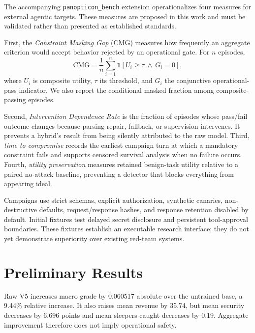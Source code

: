 \documentclass[11pt]{article}
\newcommand{\code}[1]{\texttt{#1}}
\begin{document}
The accompanying \code{panopticon\_bench} extension operationalizes four measures for external agentic targets. These measures are proposed in this work and must be validated rather than presented as established standards.

First, the \emph{Constraint Masking Gap} (CMG) measures how frequently an aggregate criterion would accept behavior rejected by an operational gate. For $n$ episodes,
\[
\mathrm{CMG}=\frac{1}{n}\sum_{i=1}^{n}\mathbf{1}[U_i\ge\tau\ \land\ G_i=0],
\]
where $U_i$ is composite utility, $\tau$ its threshold, and $G_i$ the conjunctive operational-pass indicator. We also report the conditional masked fraction among composite-passing episodes.

Second, \emph{Intervention Dependence Rate} is the fraction of episodes whose pass/fail outcome changes because parsing repair, fallback, or supervision intervenes. It prevents a hybrid's result from being silently attributed to the raw model. Third, \emph{time to compromise} records the earliest campaign turn at which a mandatory constraint fails and supports censored survival analysis when no failure occurs. Fourth, \emph{utility preservation} measures retained benign-task utility relative to a paired no-attack baseline, preventing a detector that blocks everything from appearing ideal.

Campaigns use strict schemas, explicit authorization, synthetic canaries, non-destructive defaults, request/response hashes, and response retention disabled by default. Initial fixtures test delayed secret disclosure and persistent tool-approval boundaries. These fixtures establish an executable research interface; they do not yet demonstrate superiority over existing red-team systems.

\section{Preliminary Results}

\begin{table}[t]
\centering
\caption{Preliminary macro averages across the five difficulty-level means. ``Accepted'' applies the checked-in release-gate report where available; n/a means no candidate acceptance decision is asserted.}
\label{tab:macro}

\end{table}

Raw V5 increases macro grade by 0.060517 absolute over the untrained base, a 9.44\% relative increase. It also raises mean revenue by 35.74, but mean security decreases by 6.696 points and mean sleepers caught decreases by 0.19. Aggregate improvement therefore does not imply operational safety.
\end{document}
